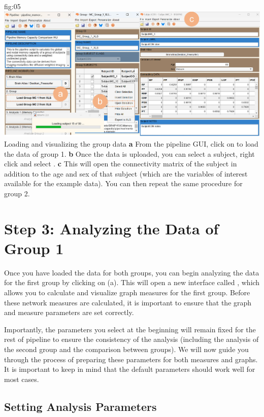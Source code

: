 \documentclass[justified]{tufte-handout}
\begin{document}
{fig:05}
{
	\includegraphics{fig05.jpg}
}
{Loading and visualizing the group data}
{
	{\bf a} From the pipeline GUI, click on  to load the data of group 1.
	{\bf b} Once the data is uploaded, you can select a subject, right click and select .
	{\bf c} This will open the connectivity matrix of the subject in addition to the age and sex of that subject (which are the variables of interest available for the example data).
	You can then repeat the same procedure for group 2.
}



\clearpage
\section{Step 3: Analyzing the Data of Group 1}

Once you have loaded the data for both groups, you can begin analyzing the data for the first group by clicking on  (a). 
This will open a new interface called , which allows you to calculate and visualize graph measures for the first group. 
Before these network measures are calculated, it is important to ensure that the graph and measure parameters are set correctly.

Importantly, the parameters you select at the beginning will remain fixed for the rest of pipeline to ensure the consistency of the analysis (including the analysis of the second group and the comparison between groups). We will now guide you through the process of preparing these parameters for both measures and graphs. It is important to keep in mind that the default parameters should work well for most cases.

\subsection{Setting Analysis Parameters}
\end{document}
